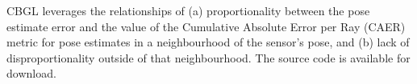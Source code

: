 \lipsum[1]
CBGL leverages the relationships of (a) proportionality between the pose
estimate error and the value of the Cumulative Absolute Error per Ray (CAER)
metric for pose estimates in a neighbourhood of the sensor's pose, and (b) lack
of disproportionality outside of that neighbourhood.
The source code is available for download.
